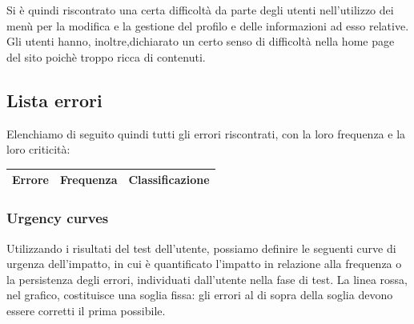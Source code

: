 \documentclass[../Report.tex]{subfiles}
\begin{document}
    Si è quindi riscontrato una certa difficoltà da parte degli utenti nell’utilizzo dei menù per la modifica e la gestione del profilo e delle informazioni ad esso relative. 
    Gli utenti hanno, inoltre,dichiarato un certo senso di difficoltà nella home page del sito poichè troppo ricca di contenuti.
    \subsection{Lista errori}
    Elenchiamo di seguito quindi tutti gli errori riscontrati, con la loro frequenza e la loro criticità:
    \begin{table}[H]
        \begin{tabular}{|c|c|c|}
            \hline
            \textbf{Errore} & \textbf{Frequenza} & \textbf{Classificazione} \\
            \hline
            
            \hline
        \end{tabular}
    \end{table}
    \subsubsection{Urgency curves}
    Utilizzando i risultati del test dell'utente, possiamo definire le seguenti curve di urgenza dell'impatto, in cui è quantificato l’impatto in relazione alla frequenza o la persistenza degli errori, individuati dall'utente nella fase di test. La linea rossa, nel grafico, costituisce una soglia fissa: gli errori al di sopra della soglia devono essere corretti il prima possibile.     
\end{document}
